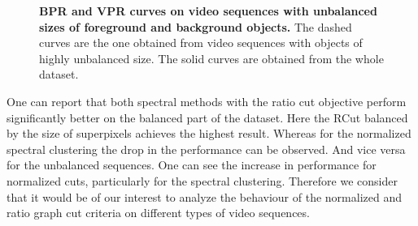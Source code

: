 \begin{figure}[!ht]
 \centering
{}
\quad%
\caption[BPR and VPR curves on video sequences with unbalanced sizes of foreground and background objects]{
{\bf BPR and VPR curves on video sequences with unbalanced sizes of foreground and background objects.} The dashed curves are the one obtained from video sequences with objects of highly unbalanced size.
The solid curves are obtained from the whole dataset.}
\label{fig:unbal}
\end{figure}

One can report that both spectral methods with the ratio cut objective perform significantly better on the balanced part of the dataset.
Here the RCut balanced by the size of superpixels achieves the highest result. Whereas for the normalized spectral clustering the drop in the performance can be observed. And vice versa for the unbalanced sequences. 
One can see the increase in performance for normalized cuts, particularly for the spectral clustering. 
Therefore we consider that it would be of our interest to analyze the behaviour of the normalized and ratio graph cut criteria on different types of video sequences.  
